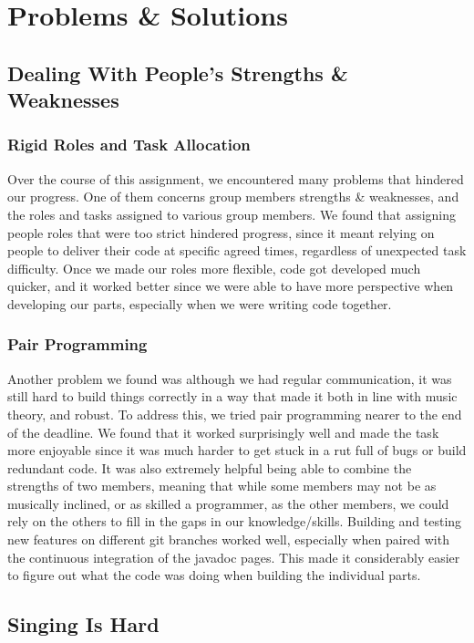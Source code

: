 \documentclass[10pt,a4paper]{article}
\begin{document}
\section{Problems \& Solutions}
\subsection{Dealing With People's Strengths \& Weaknesses}
\subsubsection{Rigid Roles and Task Allocation}
Over the course of this assignment, we encountered many problems that hindered our progress. One of them concerns group members strengths \& weaknesses, and the roles and tasks assigned to various group members. We found that assigning people roles that were too strict hindered progress, since it meant relying on people to deliver their code at specific agreed times, regardless of unexpected task difficulty. Once we made our roles more flexible, code got developed much quicker, and it worked better since we were able to have more perspective when developing our parts, especially when we were writing code together. 
\subsubsection{Pair Programming}
Another problem we found was although we had regular communication, it was still hard to build things correctly in a way that made it both in line with music theory, and robust. To address this, we tried pair programming nearer to the end of the deadline. We found that it worked surprisingly well and made the task more enjoyable since it was much harder to get stuck in a rut full of bugs or build redundant code. It was also extremely helpful being able to combine the strengths of two members, meaning that while some members may not be as musically inclined, or as skilled a programmer, as the other members, we could rely on the others to fill in the gaps in our knowledge/skills. Building and testing new features on different git branches worked well, especially when paired with the continuous integration of the javadoc pages. This made it considerably easier to figure out what the code was doing when building the individual parts. 

\subsection{Singing Is Hard}
\end{document}
